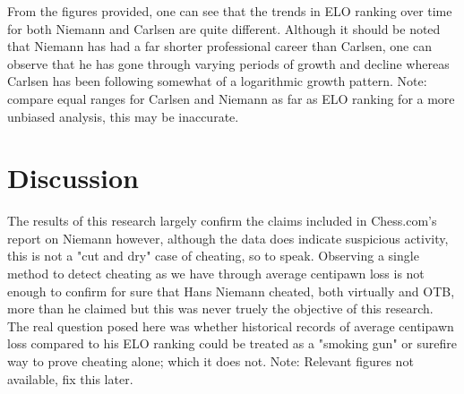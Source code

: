 \documentclass[12pt, letterpaper, titlepage]{article}
\begin{document}

From the figures provided, one can see that the trends in ELO ranking over time for both Niemann and Carlsen are quite different. Although it should be noted that Niemann has had a far shorter professional career than Carlsen, one can observe that he has gone through varying periods of growth and decline whereas Carlsen has been following somewhat of a logarithmic growth pattern. Note: compare equal ranges for Carlsen and Niemann as far as ELO ranking for a more unbiased analysis, this may be inaccurate.

\section*{Discussion}
\label{sec:disc}

The results of this research largely confirm the claims included in Chess.com's report on Niemann however, although the data does indicate suspicious activity, this is not a "cut and dry" case of cheating, so to speak. Observing a single method to detect cheating as we have through average centipawn loss is not enough to confirm for sure that Hans Niemann cheated, both virtually and OTB, more than he claimed but this was never truely the objective of this research. The real question posed here was whether historical records of average centipawn loss compared to his ELO ranking could be treated as a "smoking gun" or surefire way to prove cheating alone; which it does not. Note: Relevant figures not available, fix this later. 



\end{document}
